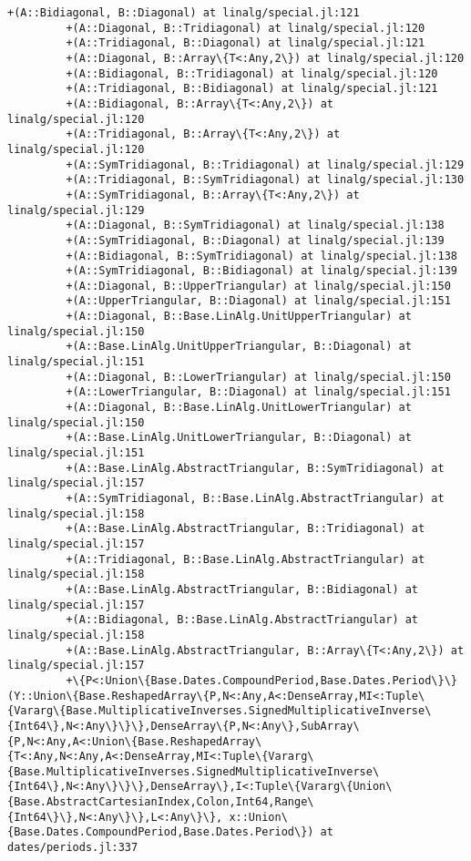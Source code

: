 \documentclass[11pt]{article}
\begin{document}
\begin{Verbatim}[commandchars=\\\{\}]
         +(A::Bidiagonal, B::Diagonal) at linalg/special.jl:121
         +(A::Diagonal, B::Tridiagonal) at linalg/special.jl:120
         +(A::Tridiagonal, B::Diagonal) at linalg/special.jl:121
         +(A::Diagonal, B::Array\{T<:Any,2\}) at linalg/special.jl:120
         +(A::Bidiagonal, B::Tridiagonal) at linalg/special.jl:120
         +(A::Tridiagonal, B::Bidiagonal) at linalg/special.jl:121
         +(A::Bidiagonal, B::Array\{T<:Any,2\}) at linalg/special.jl:120
         +(A::Tridiagonal, B::Array\{T<:Any,2\}) at linalg/special.jl:120
         +(A::SymTridiagonal, B::Tridiagonal) at linalg/special.jl:129
         +(A::Tridiagonal, B::SymTridiagonal) at linalg/special.jl:130
         +(A::SymTridiagonal, B::Array\{T<:Any,2\}) at linalg/special.jl:129
         +(A::Diagonal, B::SymTridiagonal) at linalg/special.jl:138
         +(A::SymTridiagonal, B::Diagonal) at linalg/special.jl:139
         +(A::Bidiagonal, B::SymTridiagonal) at linalg/special.jl:138
         +(A::SymTridiagonal, B::Bidiagonal) at linalg/special.jl:139
         +(A::Diagonal, B::UpperTriangular) at linalg/special.jl:150
         +(A::UpperTriangular, B::Diagonal) at linalg/special.jl:151
         +(A::Diagonal, B::Base.LinAlg.UnitUpperTriangular) at linalg/special.jl:150
         +(A::Base.LinAlg.UnitUpperTriangular, B::Diagonal) at linalg/special.jl:151
         +(A::Diagonal, B::LowerTriangular) at linalg/special.jl:150
         +(A::LowerTriangular, B::Diagonal) at linalg/special.jl:151
         +(A::Diagonal, B::Base.LinAlg.UnitLowerTriangular) at linalg/special.jl:150
         +(A::Base.LinAlg.UnitLowerTriangular, B::Diagonal) at linalg/special.jl:151
         +(A::Base.LinAlg.AbstractTriangular, B::SymTridiagonal) at linalg/special.jl:157
         +(A::SymTridiagonal, B::Base.LinAlg.AbstractTriangular) at linalg/special.jl:158
         +(A::Base.LinAlg.AbstractTriangular, B::Tridiagonal) at linalg/special.jl:157
         +(A::Tridiagonal, B::Base.LinAlg.AbstractTriangular) at linalg/special.jl:158
         +(A::Base.LinAlg.AbstractTriangular, B::Bidiagonal) at linalg/special.jl:157
         +(A::Bidiagonal, B::Base.LinAlg.AbstractTriangular) at linalg/special.jl:158
         +(A::Base.LinAlg.AbstractTriangular, B::Array\{T<:Any,2\}) at linalg/special.jl:157
         +\{P<:Union\{Base.Dates.CompoundPeriod,Base.Dates.Period\}\}(Y::Union\{Base.ReshapedArray\{P,N<:Any,A<:DenseArray,MI<:Tuple\{Vararg\{Base.MultiplicativeInverses.SignedMultiplicativeInverse\{Int64\},N<:Any\}\}\},DenseArray\{P,N<:Any\},SubArray\{P,N<:Any,A<:Union\{Base.ReshapedArray\{T<:Any,N<:Any,A<:DenseArray,MI<:Tuple\{Vararg\{Base.MultiplicativeInverses.SignedMultiplicativeInverse\{Int64\},N<:Any\}\}\},DenseArray\},I<:Tuple\{Vararg\{Union\{Base.AbstractCartesianIndex,Colon,Int64,Range\{Int64\}\},N<:Any\}\},L<:Any\}\}, x::Union\{Base.Dates.CompoundPeriod,Base.Dates.Period\}) at dates/periods.jl:337

\end{Verbatim}
\end{document}
